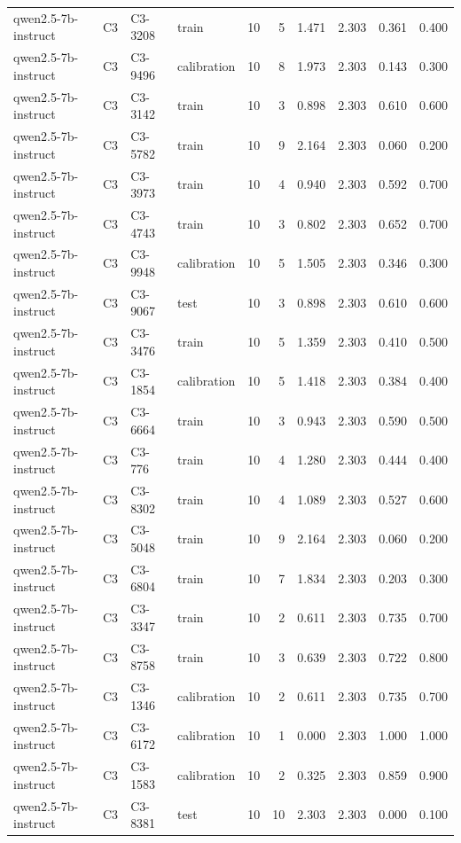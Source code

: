 \begin{table}
\begin{tabular}{llllrrrrrr}
qwen2.5-7b-instruct & C3 & C3-3208 & train & 10 & 5 & 1.471 & 2.303 & 0.361 & 0.400 \\
qwen2.5-7b-instruct & C3 & C3-9496 & calibration & 10 & 8 & 1.973 & 2.303 & 0.143 & 0.300 \\
qwen2.5-7b-instruct & C3 & C3-3142 & train & 10 & 3 & 0.898 & 2.303 & 0.610 & 0.600 \\
qwen2.5-7b-instruct & C3 & C3-5782 & train & 10 & 9 & 2.164 & 2.303 & 0.060 & 0.200 \\
qwen2.5-7b-instruct & C3 & C3-3973 & train & 10 & 4 & 0.940 & 2.303 & 0.592 & 0.700 \\
qwen2.5-7b-instruct & C3 & C3-4743 & train & 10 & 3 & 0.802 & 2.303 & 0.652 & 0.700 \\
qwen2.5-7b-instruct & C3 & C3-9948 & calibration & 10 & 5 & 1.505 & 2.303 & 0.346 & 0.300 \\
qwen2.5-7b-instruct & C3 & C3-9067 & test & 10 & 3 & 0.898 & 2.303 & 0.610 & 0.600 \\
qwen2.5-7b-instruct & C3 & C3-3476 & train & 10 & 5 & 1.359 & 2.303 & 0.410 & 0.500 \\
qwen2.5-7b-instruct & C3 & C3-1854 & calibration & 10 & 5 & 1.418 & 2.303 & 0.384 & 0.400 \\
qwen2.5-7b-instruct & C3 & C3-6664 & train & 10 & 3 & 0.943 & 2.303 & 0.590 & 0.500 \\
qwen2.5-7b-instruct & C3 & C3-776 & train & 10 & 4 & 1.280 & 2.303 & 0.444 & 0.400 \\
qwen2.5-7b-instruct & C3 & C3-8302 & train & 10 & 4 & 1.089 & 2.303 & 0.527 & 0.600 \\
qwen2.5-7b-instruct & C3 & C3-5048 & train & 10 & 9 & 2.164 & 2.303 & 0.060 & 0.200 \\
qwen2.5-7b-instruct & C3 & C3-6804 & train & 10 & 7 & 1.834 & 2.303 & 0.203 & 0.300 \\
qwen2.5-7b-instruct & C3 & C3-3347 & train & 10 & 2 & 0.611 & 2.303 & 0.735 & 0.700 \\
qwen2.5-7b-instruct & C3 & C3-8758 & train & 10 & 3 & 0.639 & 2.303 & 0.722 & 0.800 \\
qwen2.5-7b-instruct & C3 & C3-1346 & calibration & 10 & 2 & 0.611 & 2.303 & 0.735 & 0.700 \\
qwen2.5-7b-instruct & C3 & C3-6172 & calibration & 10 & 1 & 0.000 & 2.303 & 1.000 & 1.000 \\
qwen2.5-7b-instruct & C3 & C3-1583 & calibration & 10 & 2 & 0.325 & 2.303 & 0.859 & 0.900 \\
qwen2.5-7b-instruct & C3 & C3-8381 & test & 10 & 10 & 2.303 & 2.303 & 0.000 & 0.100 \\

\end{tabular}
\end{table}
